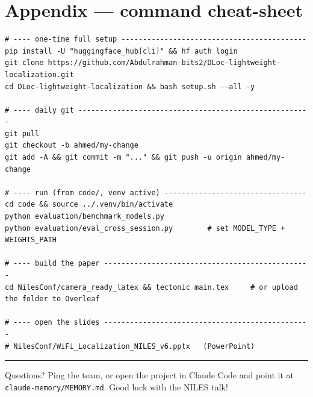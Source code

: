 \documentclass[11pt]{article}
\begin{document}
\section*{Appendix --- command cheat-sheet}
\begin{lstlisting}
# ---- one-time full setup -------------------------------------------
pip install -U "huggingface_hub[cli]" && hf auth login
git clone https://github.com/Abdulrahman-bits2/DLoc-lightweight-localization.git
cd DLoc-lightweight-localization && bash setup.sh --all -y

# ---- daily git ------------------------------------------------------
git pull
git checkout -b ahmed/my-change
git add -A && git commit -m "..." && git push -u origin ahmed/my-change

# ---- run (from code/, venv active) ---------------------------------
cd code && source ../.venv/bin/activate
python evaluation/benchmark_models.py
python evaluation/eval_cross_session.py        # set MODEL_TYPE + WEIGHTS_PATH

# ---- build the paper ------------------------------------------------
cd NilesConf/camera_ready_latex && tectonic main.tex     # or upload the folder to Overleaf

# ---- open the slides ------------------------------------------------
# NilesConf/WiFi_Localization_NILES_v6.pptx   (PowerPoint)
\end{lstlisting}

\vspace{0.6em}\hrule\vspace{0.5em}
Questions? Ping the team, or open the project in Claude Code and point it at
\texttt{claude-memory/MEMORY.md}. Good luck with the NILES talk!
\end{document}
